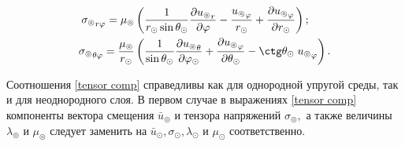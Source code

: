 \begin{equation}
\begin{gathered}
\begin{aligned}
        {\sigma_\circledcirc}_{r\varphi}=\mu_\circledcirc&\left(\frac1{r_\odot\sin\theta_\odot} \frac{\partial {u_\circledcirc}_r}{\partial\varphi} - \frac{{u_\circledcirc}_\varphi}{r_\odot} + \frac{\partial {u_\circledcirc}_\varphi}{\partial r_\odot}\right);\\
        {\sigma_\circledcirc}_{\theta\varphi}=\frac{\mu_\circledcirc} {r_\odot}&\left(\frac1{\sin\theta_\odot} \frac{\partial {u_\circledcirc}_\theta}{\partial\varphi_\odot} + \frac{\partial {u_\circledcirc}_\varphi}{\partial\theta_\odot} - \ctg\theta_\odot \;{u_\circledcirc}_\varphi \right).\\
    \end{aligned}
    \end{gathered}
\end{equation}

Соотношения \eqref{tensor comp} справедливы как для однородной упругой среды, так и для неоднородного слоя. В первом случае в выражениях \eqref{tensor comp} компоненты вектора смещения $\bar{u}_\circledcirc$ и тензора напряжений $\sigma_\circledcirc,$ а также величины $\lambda_\circledcirc$ и $\mu_\circledcirc$ следует заменить на $\bar{u}_\odot, \sigma_\odot, \lambda_\odot$ и $\mu_\odot$ соответственно.

